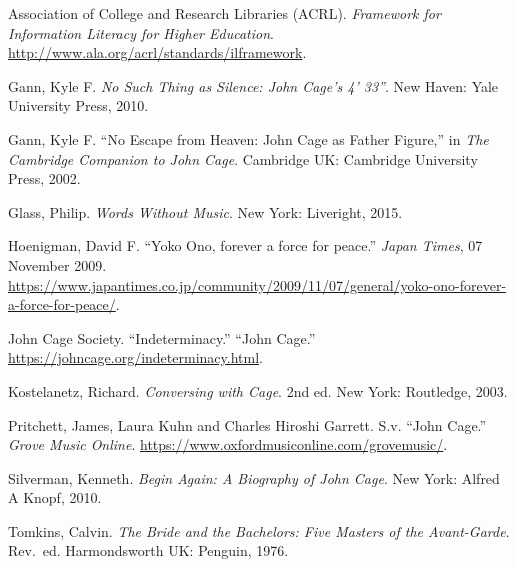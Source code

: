 \begin{mybiblist}


\item Association of College and Research Libraries (ACRL).  \textit{Framework for Information Literacy for Higher Education}. \url{http://www.ala.org/acrl/standards/ilframework}.

\item Gann, Kyle F.  \textit{No Such Thing as Silence: John Cage's \textit{4' 33''}}.  New Haven: Yale University Press, 2010.

\item Gann, Kyle F. ``No Escape from Heaven: John Cage as Father Figure,'' in \textit{The Cambridge Companion to John Cage}. Cambridge UK: Cambridge University Press, 2002.

\item Glass, Philip.  \textit{Words Without Music}.  New York: Liveright, 2015.

\item Hoenigman, David F.  ``Yoko Ono, forever a force for peace.'' \textit{Japan Times}, 07 November 2009. \url{https://www.japantimes.co.jp/community/2009/11/07/general/yoko-ono-forever-a-force-for-peace/}.

\item John Cage Society.  ``Indeterminacy.''  ``John Cage.'' \url{https://johncage.org/indeterminacy.html}.

\item Kostelanetz, Richard.  \textit{Conversing with Cage}.  2nd ed.  New York: Routledge, 2003.


\item Pritchett, James, Laura Kuhn and Charles Hiroshi Garrett.  S.v. ``John Cage.''  \textit{Grove Music Online}. \url{https://www.oxfordmusiconline.com/grovemusic/}.

\item Silverman, Kenneth. \textit{Begin Again: A Biography of John Cage}. New York: Alfred A Knopf, 2010.

\item Tomkins, Calvin.  \textit{The Bride and the Bachelors: Five Masters of the Avant-Garde}.  Rev.\ ed.  Harmondsworth UK: Penguin, 1976.


\end{mybiblist}
